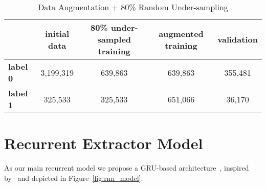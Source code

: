 \begin{enumerate}
    \begin{table}[ht]
        \centering
        \begin{tabular}{lcccc}
        \toprule
            & \textbf{initial data} & \textbf{80\% under-sampled training} & \textbf{augmented training} & \textbf{validation} \\
        \midrule
            \textbf{label 0} & 3,199,319 & 639,863 & 639,863 & 355,481 \\
            \textbf{label 1} & 325,533 & 325,533 & 651,066 & 36,170 \\
        \end{tabular}
        \caption{Data Augmentation + 80\% Random Under-sampling}\label{tab:data_augmentation}
    \end{table}
\end{enumerate}

\clearpage

\section{Recurrent Extractor Model}\label{sec:rnn_model}
As our main recurrent model we propose a GRU-based architecture~\cite{cho-etal-2014-learning}, inspired by~\cite{zmandar-etal-2021-joint} and depicted in Figure~\ref{fig:rnn_model}. \\

